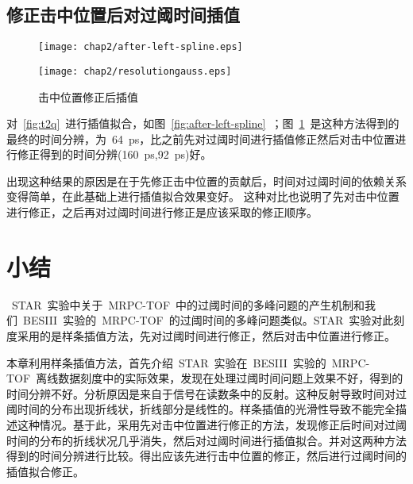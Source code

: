 \subsection{修正击中位置后对过阈时间插值}

\begin{figure}[!h]
\begin{minipage}[!h]{0.5\linewidth}
\texttt{[image: chap2/after-left-spline.eps]}
\label{fig:after-left-spline}
\end{minipage}%
\hfill
\begin{minipage}[!h]{0.5\linewidth}
\texttt{[image: chap2/resolutiongauss.eps]}
\label{fig:resolutiongauss}
\end{minipage}
\caption{击中位置修正后插值}
\end{figure}

对~\ref{fig:t2q}~进行插值拟合，如图~\ref{fig:after-left-spline}~；图~\ref{fig:resolutiongauss}~是这种方法得到的最终的时间分辨，为~64~ps，比之前先对过阈时间进行插值修正然后对击中位置进行修正得到的时间分辨(160~ps,92~ps)好。

出现这种结果的原因是在于先修正击中位置的贡献后，时间对过阈时间的依赖关系变得简单，在此基础上进行插值拟合效果变好。
这种对比也说明了先对击中位置进行修正，之后再对过阈时间进行修正是应该采取的修正顺序。

\section{小结}

~STAR~实验中关于~MRPC-TOF~中的过阈时间的多峰问题的产生机制和我们~BESIII~实验的~MRPC-TOF~的过阈时间的多峰问题类似。STAR~实验对此刻度采用的是样条插值方法，先对过阈时间进行修正，然后对击中位置进行修正。

本章利用样条插值方法，首先介绍~STAR~实验在~BESIII~实验的~MRPC-TOF~离线数据刻度中的实际效果，发现在处理过阈时间问题上效果不好，得到的时间分辨不好。分析原因是来自于信号在读数条中的反射。这种反射导致时间对过阈时间的分布出现折线状，折线部分是线性的。样条插值的光滑性导致不能完全描述这种情况。基于此，采用先对击中位置进行修正的方法，发现修正后时间对过阈时间的分布的折线状况几乎消失，然后对过阈时间进行插值拟合。并对这两种方法得到的时间分辨进行比较。得出应该先进行击中位置的修正，然后进行过阈时间的插值拟合修正。
